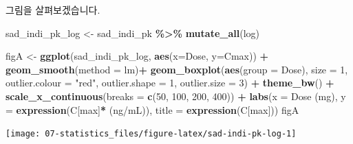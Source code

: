 \documentclass[
  12pt,
]{krantz}
\newenvironment{Shaded}{\begin{snugshade}}{\end{snugshade}}
\newcommand{\DataTypeTok}[1]{\textcolor[rgb]{0.13,0.29,0.53}{#1}}
\newcommand{\DecValTok}[1]{\textcolor[rgb]{0.00,0.00,0.81}{#1}}
\newcommand{\KeywordTok}[1]{\textcolor[rgb]{0.13,0.29,0.53}{\textbf{#1}}}
\newcommand{\NormalTok}[1]{#1}
\newcommand{\OperatorTok}[1]{\textcolor[rgb]{0.81,0.36,0.00}{\textbf{#1}}}
\newcommand{\StringTok}[1]{\textcolor[rgb]{0.31,0.60,0.02}{#1}}
\begin{document}
그림을 살펴보겠습니다.

\begin{Shaded}
\begin{Highlighting}[]
\NormalTok{sad\_indi\_pk\_log \textless{}{-}}\StringTok{ }\NormalTok{sad\_indi\_pk }\OperatorTok{\%\textgreater{}\%}\StringTok{ }\KeywordTok{mutate\_all}\NormalTok{(log)}

\NormalTok{figA \textless{}{-}}\StringTok{ }\KeywordTok{ggplot}\NormalTok{(sad\_indi\_pk\_log, }\KeywordTok{aes}\NormalTok{(}\DataTypeTok{x=}\NormalTok{Dose, }\DataTypeTok{y=}\NormalTok{Cmax)) }\OperatorTok{+}
\StringTok{  }\KeywordTok{geom\_smooth}\NormalTok{(}\DataTypeTok{method =} \StringTok{\textquotesingle{}lm\textquotesingle{}}\NormalTok{)}\OperatorTok{+}
\StringTok{  }\KeywordTok{geom\_boxplot}\NormalTok{(}\KeywordTok{aes}\NormalTok{(}\DataTypeTok{group =}\NormalTok{ Dose), }
               \DataTypeTok{size =} \DecValTok{1}\NormalTok{, }
               \DataTypeTok{outlier.colour =} \StringTok{"red"}\NormalTok{, }
               \DataTypeTok{outlier.shape =} \DecValTok{1}\NormalTok{, }
               \DataTypeTok{outlier.size =} \DecValTok{3}\NormalTok{) }\OperatorTok{+}
\StringTok{  }\KeywordTok{theme\_bw}\NormalTok{() }\OperatorTok{+}
\StringTok{  }\KeywordTok{scale\_x\_continuous}\NormalTok{(}\DataTypeTok{breaks =} \KeywordTok{c}\NormalTok{(}\DecValTok{50}\NormalTok{, }\DecValTok{100}\NormalTok{, }\DecValTok{200}\NormalTok{, }\DecValTok{400}\NormalTok{)) }\OperatorTok{+}
\StringTok{  }\KeywordTok{labs}\NormalTok{(}\DataTypeTok{x =} \StringTok{\textquotesingle{}Dose (mg)\textquotesingle{}}\NormalTok{, }\DataTypeTok{y =} \KeywordTok{expression}\NormalTok{(}\StringTok{\textquotesingle{}C\textquotesingle{}}\NormalTok{[max]}\OperatorTok{*}\StringTok{\textquotesingle{} (ng/mL)\textquotesingle{}}\NormalTok{),}
       \DataTypeTok{title =} \KeywordTok{expression}\NormalTok{(}\StringTok{\textquotesingle{}C\textquotesingle{}}\NormalTok{[max]))}
\NormalTok{figA}
\end{Highlighting}
\end{Shaded}

\texttt{[image: 07-statistics\_files/figure-latex/sad-indi-pk-log-1]}
\end{document}
